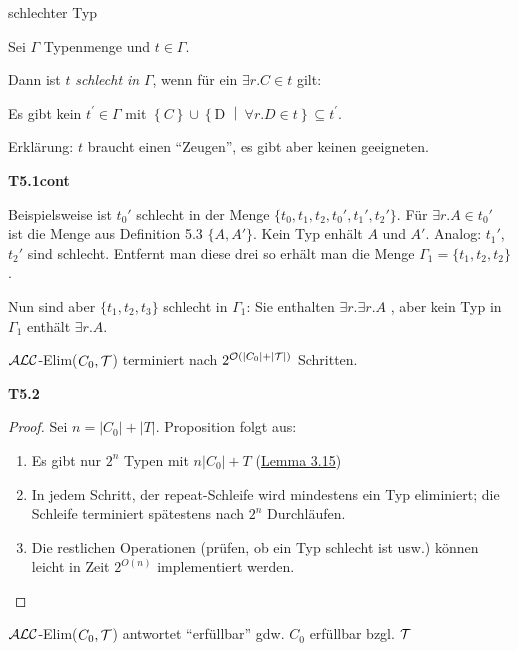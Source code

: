 \begin{definition}{schlechter Typ}

Sei $\Gamma$ Typenmenge und $t \in \Gamma$.

Dann ist $t$ \emph{schlecht in} $\Gamma$, wenn für ein $\exists r.C \in t$ gilt:

\begin{center}Es gibt kein $t^{'} \in \Gamma$ mit
$\left\{ C \right\} \cup \left\{ \text{D\ } \middle| \ \forall r.D \in t \right\} \subseteq t^{'}$.\end{center}
\end{definition}

Erklärung: $t$ braucht einen ``Zeugen'', es gibt aber keinen
geeigneten.

\textbf{T5.1cont}

Beispielsweise ist $t_0'$ schlecht in der Menge $\{t_0,t_1,t_2,t_0',t_1',t_2'\}$. Für $\exists r.A \in t_0'$ ist die Menge aus Definition 5.3 $\{A,A'\}$. Kein Typ enhält $A$ und $A'$. Analog: $t_1'$, $t_2'$ sind schlecht. Entfernt man diese drei so erhält man die Menge $\Gamma_1 = \{t_1,t_2,t_2\}$. 

Nun sind aber $\{t_1,t_2,t_3\}$ schlecht in $\Gamma_1$: Sie enthalten $\exists r. \exists r.A$ , aber kein Typ in $\Gamma_1$ enthält $\exists r.A$.

\begin{proposition}
$\mathcal{A}\mathcal{L}\mathcal{C}$-Elim($C_0,\mathcal{T}$) terminiert nach $2^{\mathcal{O}(|C_0|+|\mathcal{T}|)}$ Schritten.
\end{proposition}

\textbf{T5.2}

\begin{proof}
Sei $n = \left| C_{0} \right| + |T|$. Proposition folgt aus:

\begin{enumerate}
\def\labelenumi{\arabic{enumi}.}
\item
  Es gibt nur $2^{n}$ Typen mit $n \left| C_{0} \right| + T$
  (\protect\hyperlink{lemma-3.15}{Lemma 3.15})
\item
  In jedem Schritt, der repeat-Schleife wird mindestens ein Typ
  eliminiert; die Schleife terminiert spätestens nach $2^{n}$
  Durchläufen.
\item
  Die restlichen Operationen (prüfen, ob ein Typ schlecht ist usw.)
  können leicht in Zeit $2^{O\left( n \right)}$ implementiert werden.
\end{enumerate}
\end{proof}

\begin{proposition}
$\mathcal{A}\mathcal{L}\mathcal{C}$-Elim($C_0,\mathcal{T}$) antwortet ``erfüllbar'' gdw. $C_0$ erfüllbar bzgl. $\mathcal{T}$
\end{proposition}

